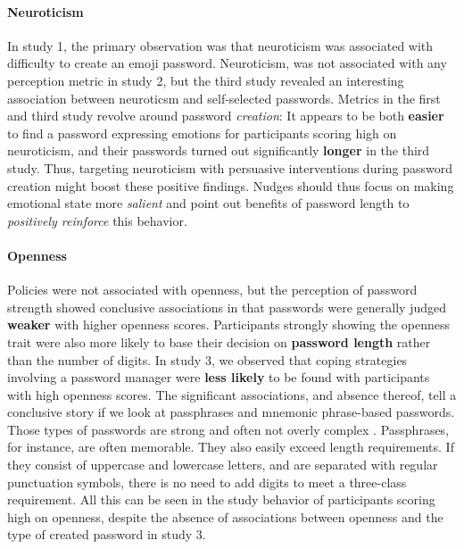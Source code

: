 \paragraph{Neuroticism} In study 1, the primary observation was that neuroticism was associated with difficulty to create an emoji password. Neuroticism, was not associated with any perception metric in study 2, but the third study revealed an interesting association between neuroticsm and self-selected passwords. Metrics in the first and third study revolve around password \textit{creation}: It appears to be both \textbf{easier} to find a password expressing emotions for participants scoring high on neuroticism, and their passwords turned out significantly \textbf{longer} in the third study. 
Thus, targeting neuroticism with persuasive interventions during password creation might boost these positive findings. Nudges should thus focus on making emotional state more \textit{salient} and point out benefits of password length to \textit{positively reinforce} this behavior. 

\paragraph{Openness} Policies were not associated with openness, but the perception of password strength showed conclusive associations in that passwords were generally judged \textbf{weaker} with higher openness scores. Participants strongly showing the openness trait were also more likely to base their decision on \textbf{password length} rather than the number of digits. In study 3, we observed that coping strategies involving a password manager were \textbf{less likely} to be found with participants with high openness scores. 
The significant associations, and absence thereof, tell a conclusive story if we look at passphrases and mnemonic phrase-based passwords. Those types of passwords are strong and often not overly complex \cite{Keith2009PassphraseDesign,Kuo2006HumanSelectionMnemonic,Shay2012CorrectHorseBatteryStaple}. Passphrases, for instance, are often memorable. They also easily exceed length requirements. If they consist of uppercase and lowercase letters, and are separated with regular punctuation symbols, there is no need to add digits to meet a three-class requirement. All this can be seen in the study behavior of participants scoring high on openness, despite the absence of associations between openness and the type of created password in study 3. 

